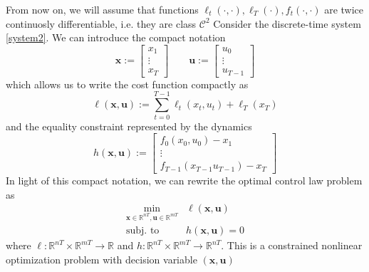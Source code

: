 \documentclass[openany]{book}
\newcommand{\R}{\mathbb{R}} %
\theoremstyle{definition}
\theoremstyle{remark}
\begin{document}
From now on, we will assume that functions $\ell_t(\cdot,\cdot),\ell_T(\cdot),f_t(\cdot,\cdot)$ are twice continuosly differentiable, i.e. they are class $\mathcal{C}^2$
Consider the discrete-time system \eqref{system2}. We can introduce the compact notation 
\[
    \mathbf{x} := \begin{bmatrix}
        x_1 \\ \vdots \\ x_T
    \end{bmatrix} \qquad \mathbf{u} := \begin{bmatrix}
        u_0 \\ \vdots \\ u_{T-1}
    \end{bmatrix}
\]
which allows us to write the cost function compactly as 
\[
    \ell({\mathbf{x},\mathbf{u}}) := \sum_{t=0}^{T-1}\ell_t(x_t,u_t)+\ell_T(x_T)
\]
and the equality constraint represented by the dynamics 
\[
    h(\mathbf{x},\mathbf{u}) := \begin{bmatrix}
        f_0(x_0,u_0)-x_1 \\ \vdots \\ f_{T-1}(x_{T-1}u_{T-1})-x_T
    \end{bmatrix}
\]
In light of this compact notation, we can rewrite the optimal control law problem as 
\begin{align*}
    \min_{\mathbf{x}\in\R^{nT},\mathbf{u}\in\R^{mT}} &\ell(\mathbf{x},\mathbf{u})\\
    \text{subj. to } & h(\mathbf{x},\mathbf{u})=0
\end{align*}
where $\ell:\R^{nT}\times\R^{mT}\to\R$ and $h:\R^{nT}\times\R^{mT}\to\R^{nT}$. This is a constrained nonlinear optimization problem with decision variable $(\mathbf{x},\mathbf{u})$
\end{document}
